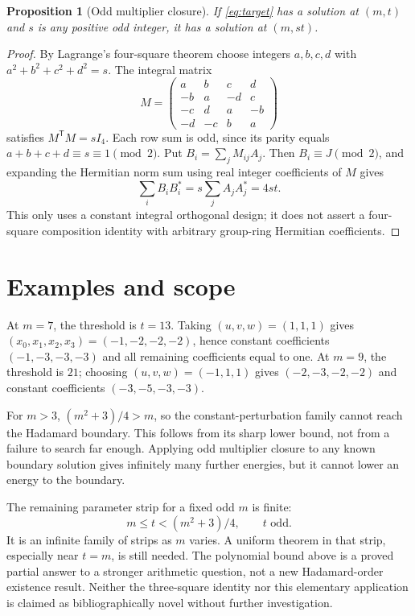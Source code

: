 \documentclass[11pt]{article}
\newtheorem{proposition}{Proposition}[section]
\begin{document}
\begin{proposition}[Odd multiplier closure]\label{prop:multiplier}
If \eqref{eq:target} has a solution at $(m,t)$ and $s$ is any positive
odd integer, it has a solution at $(m,st)$.
\end{proposition}
\begin{proof}
By Lagrange's four-square theorem choose integers $a,b,c,d$ with
$a^2+b^2+c^2+d^2=s$. The integral matrix
\[
 M=\begin{pmatrix}
 a&b&c&d\\-b&a&-d&c\\-c&d&a&-b\\-d&-c&b&a
 \end{pmatrix}
\]
satisfies $M^{\mathsf T}M=sI_4$. Each row sum is odd, since its parity
equals $a+b+c+d\equiv s\equiv1\pmod2$.
Put $B_i=\sum_jM_{ij}A_j$. Then $B_i\equiv J\pmod2$, and expanding
the Hermitian norm sum using real integer coefficients of $M$ gives
\[
 \sum_i B_iB_i^*=s\sum_jA_jA_j^*=4st.
\]
This only uses a constant integral orthogonal design; it does not
assert a four-square composition identity with arbitrary group-ring
Hermitian coefficients.
\end{proof}

\section*{Examples and scope}
At $m=7$, the threshold is $t=13$. Taking $(u,v,w)=(1,1,1)$ gives
$(x_0,x_1,x_2,x_3)=(-1,-2,-2,-2)$, hence constant coefficients
$(-1,-3,-3,-3)$ and all remaining coefficients equal to one.
At $m=9$, the threshold is $21$; choosing $(u,v,w)=(-1,1,1)$ gives
$(-2,-3,-2,-2)$ and constant coefficients $(-3,-5,-3,-3)$.

For $m>3$, $(m^2+3)/4>m$, so the constant-perturbation family cannot
reach the Hadamard boundary. This follows from its sharp lower bound,
not from a failure to search far enough. Applying odd multiplier closure
to any known boundary solution gives infinitely many further energies,
but it cannot lower an energy to the boundary.

The remaining parameter strip for a fixed odd $m$ is finite:
\[
 m\le t<(m^2+3)/4,\qquad t\text{ odd}.
\]
It is an infinite family of strips as $m$ varies. A uniform theorem in
that strip, especially near $t=m$, is still needed. The polynomial
bound above is a proved partial answer to a stronger arithmetic question,
not a new Hadamard-order existence result. Neither the three-square
identity nor this elementary application is claimed as bibliographically
novel without further investigation.
\end{document}
